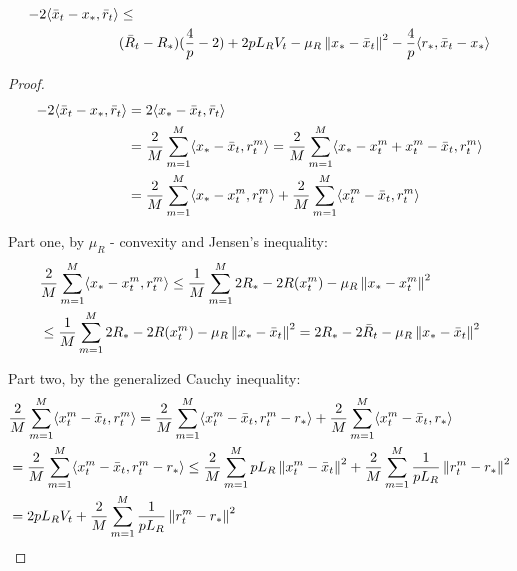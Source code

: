 \begin{lemma} \label{lem:inner_2}
\begin{align}
    \begin{split}
    - 2 \inner{\bar{x}_t - x_*}{\bar{r}_t} &\leq \\ 
     & (\bar{R}_t - R_*)(\frac{4}{p} - 2) + 2 p L_R V_t - \mu_R \norm{x_* - \bar{x}_t}^2 
     - \frac{4}{p}\inner{r_*}{\bar{x}_t - x_*}
    \end{split}
\end{align}
\end{lemma}
\begin{proof}
    \begin{align}
        - 2 \inner{\bar{x}_t - x_*}{\bar{r}_t} &= 2 \inner{x_* - \bar{x}_t} {\bar{r}_t} \\
        &= \frac{2}{M} \summ{m=1}{M}{ \inner{x_* - \bar{x}_t}{r^m_t} } 
        = \frac{2}{M} \summ{m=1}{M}{\inner{x_* - x^m_t + x^m_t - \bar{x}_t}{r^m_t}} \\
        &= \frac{2}{M} \summ{m=1}{M}{\inner{x_* - x^m_t}{r^m_t}} 
        + \frac{2}{M} \summ{m=1}{M}{\inner{x^m_t - \bar{x}_t}{r^m_t}} \label{eq:St_3_0}
    \end{align}
    
    Part one, by $\mu_R$ - convexity and Jensen's inequality:
    \begin{align}
        &\frac{2}{M} \summ{m=1}{M}{\inner{x_* - x^m_t}{r^m_t}} 
        \leq \frac{1}{M} \summ{m=1}{M}{2 R_* - 2 R(x^m_t) - \mu_R \norm{x_* - x^m_t}^2} \\
        &\leq \frac{1}{M} \summ{m=1}{M}{2 R_* - 2 R(x^m_t) - \mu_R \norm{x_* - \bar{x}_t}^2} 
        = 2 R_* - 2 \bar{R}_t - \mu_R \norm{x_* - \bar{x}_t}^2 \label{eq:St_3_1}
    \end{align}
    
    Part two, by the generalized Cauchy inequality:
    \begin{align}
        &\frac{2}{M} \summ{m=1}{M}{\inner{x^m_t - \bar{x}_t}{r^m_t}}
        = \frac{2}{M} \summ{m=1}{M}{\inner{x^m_t - \bar{x}_t}{r^m_t - r_*}} 
        + \frac{2}{M} \summ{m=1}{M}{\inner{x^m_t - \bar{x}_t}{r_*}} \\
        &= \frac{2}{M} \summ{m=1}{M}{\inner{x^m_t - \bar{x}_t}{r^m_t - r_*}} 
        \leq \frac{2}{M} \summ{m=1}{M}{p L_R \norm{x^m_t - \bar{x}_t}^2 }
        + \frac{2}{M} \summ{m=1}{M}{\frac{1}{p L_R} \norm{r^m_t-r_*}^2 } \\
        &= 2 p L_R V_t 
        + \frac{2}{M} \summ{m=1}{M}{\frac{1}{p L_R} \norm{r^m_t-r_*}^2 } \label{eq:St_3_2_1}
    \end{align}
    

\end{proof}
